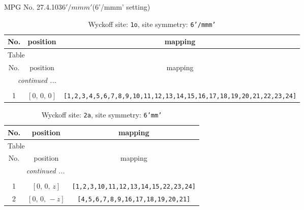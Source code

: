 \documentclass[fleqn,8pt]{jsarticle}
\begin{document}
\setcounter{MaxMatrixCols}{32}

\renewcommand{\tablename}{Table~}
\renewcommand{\figurename}{Figure~}
\begin{center}
\LARGE
MPG No. 27.4.103\quad$6'/mmm'$\quad(6'/mmm' setting)
\end{center}
\renewcommand{\arraystretch}{1.2}
\begin{longtable}{ccc}
\caption{Wyckoff site: {\tt 1o}, site symmetry: {\tt 6'/mmm'}}
 \\
 \hline \hline
No. & position & mapping \\ \hline \endfirsthead

\multicolumn{2}{l}{\tablename\ \thetable{}} \\
 \hline \hline
No. & position & mapping \\ \hline \endhead

 \hline \hline
\multicolumn{2}{r}{\footnotesize\it continued ...} \\ \endfoot

 \hline \hline
\multicolumn{2}{r}{} \\ \endlastfoot

1 & $\left[ 0,\, 0,\, 0 \right]$ & {\tt [1,2,3,4,5,6,7,8,9,10,11,12,13,14,15,16,17,18,19,20,21,22,23,24]} \\
\end{longtable}
\renewcommand{\arraystretch}{1.2}
\begin{longtable}{ccc}
\caption{Wyckoff site: {\tt 2a}, site symmetry: {\tt 6'mm'}}
 \\
 \hline \hline
No. & position & mapping \\ \hline \endfirsthead

\multicolumn{2}{l}{\tablename\ \thetable{}} \\
 \hline \hline
No. & position & mapping \\ \hline \endhead

 \hline \hline
\multicolumn{2}{r}{\footnotesize\it continued ...} \\ \endfoot

 \hline \hline
\multicolumn{2}{r}{} \\ \endlastfoot

1 & $\left[ 0,\, 0,\, z \right]$ & {\tt [1,2,3,10,11,12,13,14,15,22,23,24]} \\ \hline
2 & $\left[ 0,\, 0,\, - z \right]$ & {\tt [4,5,6,7,8,9,16,17,18,19,20,21]} \\
\end{longtable}
\renewcommand{\arraystretch}{1.2}
\end{document}
